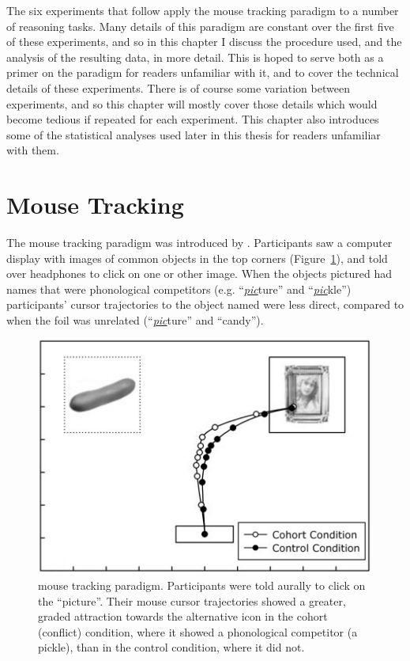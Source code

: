 
The six experiments that follow
apply the mouse tracking paradigm to a number of reasoning tasks.
Many details of this paradigm are constant over the first five of these experiments,
and so in this chapter I discuss the procedure used,
and the analysis of the resulting data, in more detail.
This is hoped to serve both as a primer
on the paradigm for readers unfamiliar with it,
and to cover the technical details of these experiments.
There is of course some variation between experiments,
and so this chapter will mostly cover those details
which would become tedious if repeated for each experiment.
This chapter also introduces some of the statistical analyses
used later in this thesis for readers unfamiliar with them.

\section{Mouse Tracking}\label{sec:chapter2-mousetracking}

The mouse tracking paradigm was introduced by \citet{Spivey2005}.
Participants saw a computer display with images of common objects in the top corners
(Figure~\ref{fig:chapter2-spivey}),
and told over headphones to click on one or other image.
When the objects pictured had names that were phonological competitors
(e.g. ``\underline{\emph{pic}}ture'' and ``\underline{\emph{pic}}kle'')
participants' cursor trajectories to the object named were less direct,
compared to when the foil was unrelated (``\underline{\emph{pic}}ture'' and ``candy'').

\begin{figure}[ht]
  \centering
  \includegraphics[width=.7\textwidth]{../1.Conflict/imgs/spivey.png}
  \caption[ mouse tracking paradigm.]{
     mouse tracking paradigm.
    Participants were told aurally to click on the ``picture''.
    Their mouse cursor trajectories showed a greater, graded attraction
    towards the alternative icon in the cohort (conflict) condition,
    where it showed a phonological competitor (a pickle), than in the control condition,
    where it did not.
    \label{fig:chapter2-spivey}
  }
\end{figure}

